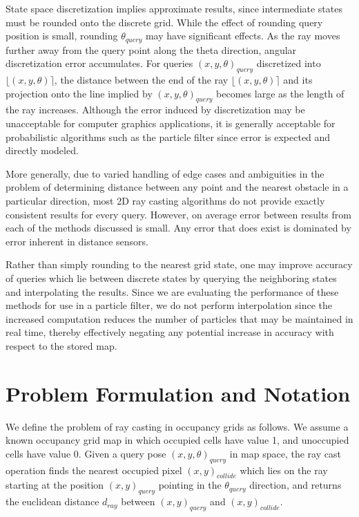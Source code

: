 \documentclass[letterpaper, 10 pt, conference]{ieeeconf}  %
\begin{document}
State space discretization implies approximate results, since intermediate states must be rounded onto the discrete grid. While the effect of rounding query position is small, rounding $\theta_{query}$ may have significant effects. As the ray moves further away from the query point along the theta direction, angular discretization error accumulates. For queries $(x,y,\theta)_{query}$ discretized into $\lfloor(x,y,\theta)\rceil$, the distance between the end of the ray $\lfloor(x,y,\theta)\rceil$ and its projection onto the line implied by $(x,y,\theta)_{query}$ becomes large as the length of the ray increases. Although the error induced by discretization may be unacceptable for computer graphics applications, it is generally acceptable for probabilistic algorithms such as the particle filter since error is expected and directly modeled. 

More generally, due to varied handling of edge cases and ambiguities in the problem of determining distance between any point and the nearest obstacle in a particular direction, most 2D ray casting algorithms do not provide exactly consistent results for every query. However, on average error between results from each of the methods discussed is small. Any error that does exist is dominated by error inherent in distance sensors.

Rather than simply rounding to the nearest grid state, one may improve accuracy of queries which lie between discrete states by querying the neighboring states and interpolating the results. Since we are evaluating the performance of these methods for use in a particle filter, we do not perform interpolation since the increased computation reduces the number of particles that may be maintained in real time, thereby effectively negating any potential increase in accuracy with respect to the stored map.

\section{Problem Formulation and Notation}

We define the problem of ray casting in occupancy grids as follows. We assume a known occupancy grid map in which occupied cells have value 1, and unoccupied cells have value 0. Given a query pose $(x,y,\theta)_{query}$ in map space, the ray cast operation finds the nearest occupied pixel $(x,y)_{collide}$ which lies on the ray starting at the position $(x,y)_{query}$ pointing in the $\theta_{query}$ direction, and returns the euclidean distance $d_{ray}$ between $(x,y)_{query}$ and $(x,y)_{collide}$.
\end{document}
